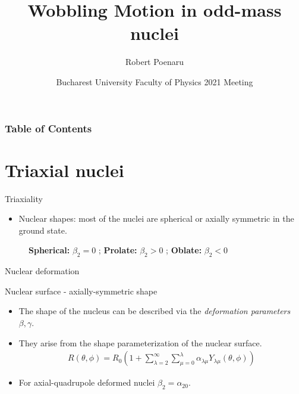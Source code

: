 \documentclass{beamer}
\title[Wobbling Motion in Odd-Mass Nuclei] %
{Wobbling Motion in odd-mass nuclei}
\author[R. Poenaru] %
{Robert Poenaru\inst{1,2}}
\institute[DFT @ IFIN-HH] %
{
  \inst{1}%
  Department of Theoretical Physics\newline
  IFIN-HH
  \and
  \inst{2}%
  Faculty of Physics\newline
  University of Bucharest
}
\date[\today] %
{Bucharest University Faculty of Physics 2021 Meeting}
\begin{document}
\maketitle
\begin{frame}
\frametitle{Table of Contents}
\tableofcontents
\end{frame}

\section{Triaxial nuclei}

\begin{frame}{Triaxiality}
\begin{itemize}
    \item Nuclear shapes: most of the nuclei are spherical or axially symmetric in the ground state.
\end{itemize}
  \begin{figure}
    \centering
    \caption{\textbf{Spherical:} $\beta_2=0$ ; \textbf{Prolate:} $\beta_2>0$ ; \textbf{Oblate:} $\beta_2<0$}
  \end{figure}
\end{frame}

\begin{frame}{Nuclear deformation}
    \begin{block}{Nuclear surface - axially-symmetric shape}
    \begin{itemize}
    \item The shape of the nucleus can be described via the \textit{deformation parameters} $\beta,\gamma$. 
    \item They arise from the shape parameterization of the nuclear surface.
    \begin{align}
        R(\theta,\phi)=R_0\left(1+\sum_{\lambda=2}^{\infty}\sum_{\mu=0}^{\lambda}\alpha_{\lambda\mu}Y_{\lambda\mu}(\theta,\phi)\right)
    \end{align}
    \item For axial-quadrupole deformed nuclei $\beta_2=\alpha_{20}$.
    \end{itemize}
    \end{block}
\end{frame}
\end{document}
